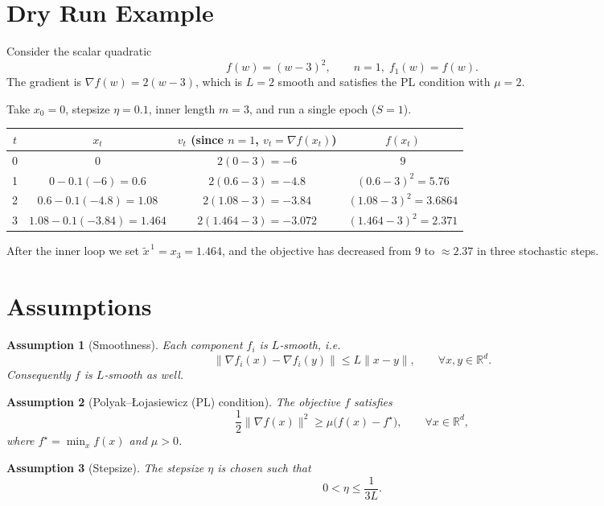 \documentclass{article}
\newtheorem{assumption}{Assumption}
\begin{document}
\section*{Dry Run Example}
Consider the scalar quadratic 
\[
f(w)=(w-3)^2,\qquad n=1,\; f_1(w)=f(w).
\]
The gradient is $\nabla f(w)=2(w-3)$, which is $L=2$ smooth and satisfies the PL condition with $\mu=2$.

Take $x_0=0$, stepsize $\eta=0.1$, inner length $m=3$, and run a single epoch ($S=1$).

\begin{center}
\begin{tabular}{c|c|c|c}
$t$ & $x_t$ & $v_t$ (since $n=1$, $v_t=\nabla f(x_t)$) & $f(x_t)$\\ \hline
0 & $0$ & $2(0-3)=-6$ & $9$\\
1 & $0-0.1(-6)=0.6$ & $2(0.6-3)=-4.8$ & $(0.6-3)^2=5.76$\\
2 & $0.6-0.1(-4.8)=1.08$ & $2(1.08-3)=-3.84$ & $(1.08-3)^2=3.6864$\\
3 & $1.08-0.1(-3.84)=1.464$ & $2(1.464-3)=-3.072$ & $(1.464-3)^2=2.371$\\
\end{tabular}
\end{center}

After the inner loop we set $\tilde{x}^{\,1}=x_3=1.464$, and the objective has decreased from $9$ to $\approx2.37$ in three stochastic steps.

\section*{Assumptions}
\begin{assumption}[Smoothness]\label{ass:smooth}
Each component $f_i$ is $L$‑smooth, i.e.
\[
\|\nabla f_i(x)-\nabla f_i(y)\|\le L\|x-y\|,\qquad\forall x,y\in\mathbb{R}^d .
\]
Consequently $f$ is $L$‑smooth as well.
\end{assumption}

\begin{assumption}[Polyak–Łojasiewicz (PL) condition]\label{ass:pl}
The objective $f$ satisfies
\[
\frac{1}{2}\|\nabla f(x)\|^2\ge \mu\bigl(f(x)-f^\star\bigr),\qquad\forall x\in\mathbb{R}^d,
\]
where $f^\star=\min_x f(x)$ and $\mu>0$.
\end{assumption}

\begin{assumption}[Stepsize]\label{ass:stepsize}
The stepsize $\eta$ is chosen such that
\[
0<\eta\le \frac{1}{3L}.
\]
\end{assumption}
\end{document}
